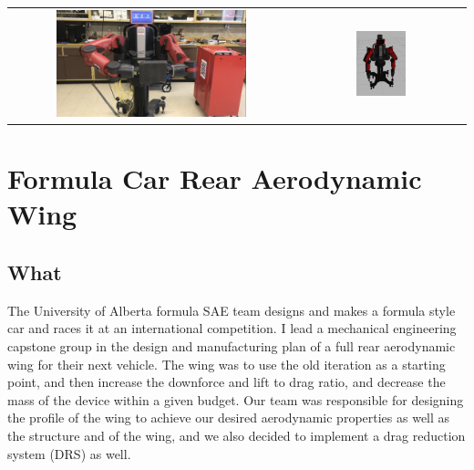 \documentclass[11pt]{article}
\begin{document}
\vspace{0 mm}

\begin{center}
    \begin{tabular}{cc}
        \includegraphics[width=0.6915\textwidth, trim={25mm, 20mm, 60mm, 0mm}, clip]{images/baxter.png} & \includegraphics[width=0.3085\textwidth, trim={25mm, 20mm, 30mm, 0mm}, clip]{images/baxter_sim.png} \\
    \end{tabular}
\end{center}
\newpage

\section*{Formula Car Rear Aerodynamic Wing}
\subsection*{What}
The University of Alberta formula SAE team designs and makes a formula style car and races it at an international competition. I lead a mechanical engineering capstone group in the design and manufacturing plan of a full rear aerodynamic wing for their next vehicle. The wing was to use the old iteration as a starting point, and then increase the downforce and lift to drag ratio, and decrease the mass of the device within a given budget. Our team was responsible for designing the profile of the wing to achieve our desired aerodynamic properties as well as the structure and of the wing, and we also decided to implement a drag reduction system (DRS) as well.
\end{document}
